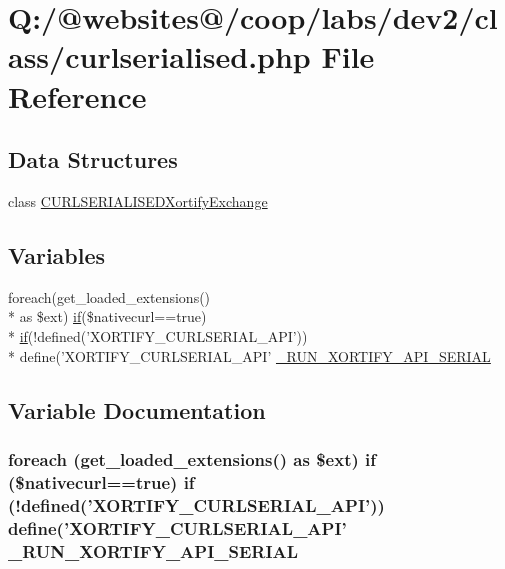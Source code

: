 \hypertarget{curlserialised_8php}{\section{Q\-:/@websites@/coop/labs/dev2/class/curlserialised.php File Reference}
\label{curlserialised_8php}
}
\subsection*{Data Structures}
\begin{DoxyCompactItemize}
\item 
class \hyperlink{class_c_u_r_l_s_e_r_i_a_l_i_s_e_d_xortify_exchange}{C\-U\-R\-L\-S\-E\-R\-I\-A\-L\-I\-S\-E\-D\-Xortify\-Exchange}
\end{DoxyCompactItemize}
\subsection*{Variables}
\begin{DoxyCompactItemize}
\item 
foreach(get\-\_\-loaded\-\_\-extensions() \\*
as \$ext) \hyperlink{index_8php_ae2ccdf355624402b65fc2226f2a661cd}{if}(\$nativecurl==true) \\*
\hyperlink{index_8php_ae2ccdf355624402b65fc2226f2a661cd}{if}(!defined('X\-O\-R\-T\-I\-F\-Y\-\_\-\-C\-U\-R\-L\-S\-E\-R\-I\-A\-L\-\_\-\-A\-P\-I')) \\*
define('X\-O\-R\-T\-I\-F\-Y\-\_\-\-C\-U\-R\-L\-S\-E\-R\-I\-A\-L\-\_\-\-A\-P\-I' \hyperlink{curlserialised_8php_a4f236c6c653893d7e8bd372d64071527}{\-\_\-\-R\-U\-N\-\_\-\-X\-O\-R\-T\-I\-F\-Y\-\_\-\-A\-P\-I\-\_\-\-S\-E\-R\-I\-A\-L}
\end{DoxyCompactItemize}


\subsection{Variable Documentation}
\hypertarget{curlserialised_8php_a4f236c6c653893d7e8bd372d64071527}{
\subsubsection[{\-\_\-\-R\-U\-N\-\_\-\-X\-O\-R\-T\-I\-F\-Y\-\_\-\-A\-P\-I\-\_\-\-S\-E\-R\-I\-A\-L}]{\setlength{\rightskip}{0pt plus 5cm}foreach (get\-\_\-loaded\-\_\-extensions() as \$ext) {\bf if} (\$nativecurl==true) {\bf if} (!defined('X\-O\-R\-T\-I\-F\-Y\-\_\-\-C\-U\-R\-L\-S\-E\-R\-I\-A\-L\-\_\-\-A\-P\-I')) define('X\-O\-R\-T\-I\-F\-Y\-\_\-\-C\-U\-R\-L\-S\-E\-R\-I\-A\-L\-\_\-\-A\-P\-I' \-\_\-\-R\-U\-N\-\_\-\-X\-O\-R\-T\-I\-F\-Y\-\_\-\-A\-P\-I\-\_\-\-S\-E\-R\-I\-A\-L}}\label{curlserialised_8php_a4f236c6c653893d7e8bd372d64071527}
